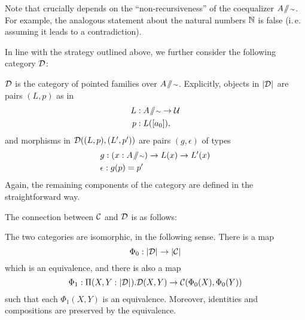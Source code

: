 \begin{remark}
Note that  crucially depends on the ``non-recur\-siveness''
of the coequalizer $A \! \sslash \! {\scriptstyle \sim}$.
For example, the analogous statement about the natural numbers $\mathbb{N}$ is false
(i.\,e. assuming it leads to a contradiction).
\end{remark}

In line with the strategy outlined above, we further consider the following
category $\mathcal D$:
\begin{defn}\label{def:paths-catD}
 $\mathcal D$ is the category of pointed families over $A \! \sslash \! {\scriptstyle \sim}$.
 Explicitly, objects in $\mathopen{}\left|\mathcal D\right|_{}^{}\mathclose{}$ are pairs $(L,p)$ as in
 \begin{align*}
  L &: A \! \sslash \! {\scriptstyle \sim} \to \mathcal{U} \\
  p &: L([a_0]),
 \end{align*}
 and morphisms in $\mathcal D((L,p), (L',p'))$ are pairs $(g,\epsilon)$ of types 
 \begin{align}
  & g : (x : A \! \sslash \! {\scriptstyle \sim}) \to L(x) \to L'(x) \label{eq:D0-morph-g}  \\
  & \epsilon : g(p) = p' \label{eq:D0-morph-e}
 \end{align}
 Again, the remaining components of the category are defined in the straightforward way.
\end{defn}

The connection between $\mathcal C$ and $\mathcal D$ is as follows:
\begin{lemma} \label{lem:paths-cats-are-iso}
 The two categories are isomorphic, in the following sense.
 There is a map
 \begin{equation} \label{eq:Phi0-folded}
  \Phi_0 : \mathopen{}\left|\mathcal D\right|_{}^{}\mathclose{} \to \mathopen{}\left|\mathcal C\right|_{}^{}\mathclose{}
 \end{equation}
 which is an equivalence, and there is also a map
 \begin{equation} \label{eq:Phi1-folded}
  \Phi_1 : \Pi (X,Y : \mathopen{}\left|\mathcal D\right|_{}^{}\mathclose{}). \mathcal D(X,Y) \to \mathcal C(\Phi_0(X),\Phi_0(Y))
 \end{equation}
 such that each $\Phi_1(X,Y)$ is an equivalence.
 Moreover, identities and compositions are preserved by the equivalence.
\end{lemma}

